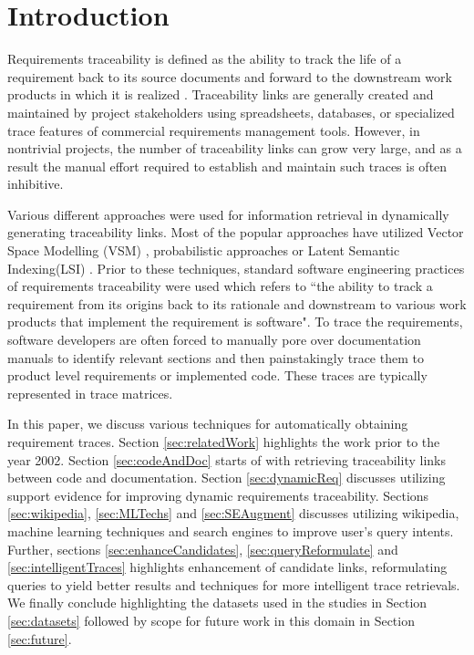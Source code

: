 \documentclass{report}
\begin{document}


\section{Introduction}
Requirements traceability is defined as the ability to track the life of a requirement
back to its source documents and forward to the downstream work
products in which it is realized \cite{hayes94}. Traceability links are
generally created and maintained by project stakeholders using
spreadsheets, databases, or specialized trace features of
commercial requirements management tools. However, in nontrivial
projects, the number of traceability links can grow very large, 
and as a result the manual effort required to establish and
maintain such traces is often inhibitive.

Various different approaches were used for information retrieval in dynamically
generating traceability links. Most of the popular approaches have utilized 
Vector Space Modelling (VSM) \cite{hayesVSM06}, probabilistic approaches \cite{clelandHuang05} or 
Latent Semantic Indexing(LSI) \cite{antoniol02, LSI00}. Prior to these techniques, standard software
engineering practices of requirements traceability were used which refers to ``the ability to track 
a requirement from its origins back to its rationale and downstream to various work products
that implement the requirement is software"\cite{gotel94}. To trace the requirements, software
developers are often forced to manually pore over documentation manuals to identify relevant sections 
and then painstakingly trace them to product level requirements or implemented code. These traces
are typically represented in trace matrices.

In this paper, we discuss various techniques for automatically obtaining requirement traces. Section \ref{sec:relatedWork} highlights the work prior to the year 2002. Section \ref{sec:codeAndDoc} starts of with retrieving traceability links between code and documentation. 
Section \ref{sec:dynamicReq} discusses utilizing support evidence for improving dynamic requirements traceability.
Sections \ref{sec:wikipedia}, \ref{sec:MLTechs} and \ref{sec:SEAugment} discusses utilizing wikipedia, machine
learning techniques and search engines to improve user's query intents. Further, sections \ref{sec:enhanceCandidates},
\ref{sec:queryReformulate} and \ref{sec:intelligentTraces}
highlights enhancement of candidate links, reformulating queries to yield better results and techniques for more
intelligent trace retrievals. We finally conclude highlighting the datasets used in the studies in Section \ref{sec:datasets} followed by scope for future work in this domain in Section \ref{sec:future}.
\end{document}
